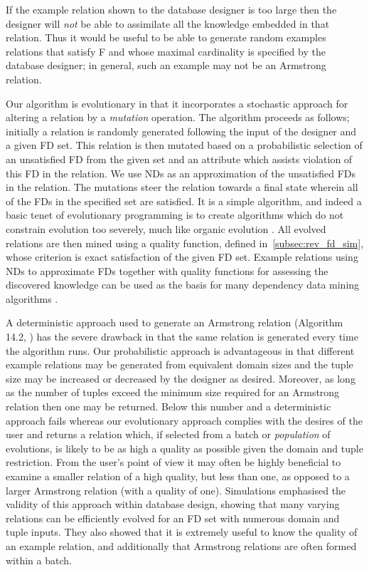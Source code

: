 If the example relation shown to the database designer is too large then 
the designer will {\em not} be able to assimilate all the knowledge embedded in
that relation. Thus it would be useful to be able to generate random examples 
relations that satisfy F and whose maximal cardinality is specified by the 
database designer; in general, such an example may not be an Armstrong
relation.

\smallskip

Our algorithm is evolutionary in that it incorporates a stochastic approach
for altering a relation by a {\em mutation} operation.
 The algorithm proceeds as
follows; initially a relation is randomly generated following
the input of the designer and a given FD set. This relation is then
 mutated based on a probabilistic selection of an unsatisfied FD  from the
given set and an attribute which assists violation of this FD in the relation.
We use NDs as an
approximation of the unsatisfied FDs in the relation. 
The mutations steer the relation
towards a final state wherein all of the FDs in the specified set are
satisfied. It is a simple algorithm, and indeed a basic tenet 
of evolutionary programming is to create algorithms 
which do not constrain evolution too severely,
 much like organic evolution \cite{bs93}. All evolved relations are then mined 
using a quality function, defined in~\ref{subsec:rev_fd_sim}, whose criterion is exact satisfaction of the given FD set. Example relations using NDs to approximate FDs together
with quality functions for assessing the discovered knowledge 
can be used as the basis for many dependency data mining algorithms \cite{kdd96}.

\smallskip

A deterministic approach used to generate an Armstrong relation
(Algorithm 14.2, \cite{Mann92}) has the severe drawback
 in that the same relation
is generated every time the algorithm runs.  Our probabilistic
approach is advantageous in that different example relations may
be generated from equivalent domain sizes and the tuple size may be
increased or decreased by the designer as desired. Moreover, as long as 
the number of tuples exceed the minimum size required for an Armstrong relation
 \cite{bdfs84,mr86} then one may
be returned.  Below this number and a deterministic approach fails
 whereas our evolutionary approach complies with the desires of the user
and returns a relation which, if selected from a batch or {\em 
population} of evolutions, is likely to be as high a quality
as possible given the domain and tuple restriction.  From the user's
point of view it may often be highly beneficial to examine a smaller
relation of a high quality, but less than one, as opposed to a larger Armstrong
relation (with a quality of one).
Simulations
emphasised the validity of this approach within database
design, showing that many varying relations can be efficiently
evolved for an FD set with numerous domain and tuple inputs.
 They also showed that it is extremely useful to know the quality of an
 example relation, and additionally that Armstrong
relations are often formed within a batch. 




